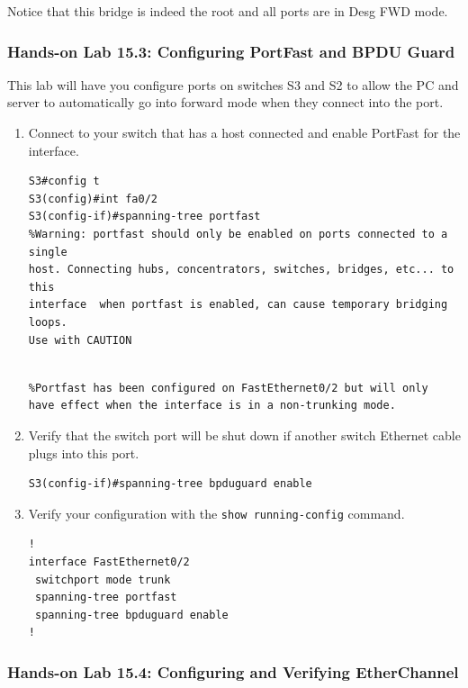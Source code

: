 \documentclass[b5paper,11pt]{memoir}
\begin{document}
Notice that this bridge is indeed the root and all ports are in Desg FWD
mode.

\subsubsection[Hands-on Lab 15.3: Configuring PortFast and BPDU
Guard]{\texorpdfstring{\protect\hypertarget{c15.xhtmlux5cux23c15-sec-27}{}{}Hands-on
Lab 15.3: Configuring PortFast and BPDU
Guard}{Hands-on Lab 15.3: Configuring PortFast and BPDU Guard}}

This lab will have you configure ports on switches S3 and S2 to allow
the PC and server to automatically go into forward mode when they
connect into the port.

\begin{enumerate}
\item
  Connect to your switch that has a host connected and enable PortFast
  for the interface.

\begin{verbatim}
S3#config t
S3(config)#int fa0/2
S3(config-if)#spanning-tree portfast
%Warning: portfast should only be enabled on ports connected to a single
host. Connecting hubs, concentrators, switches, bridges, etc... to this
interface  when portfast is enabled, can cause temporary bridging loops.
Use with CAUTION
\end{verbatim}

\begin{verbatim}
 
%Portfast has been configured on FastEthernet0/2 but will only
have effect when the interface is in a non-trunking mode.
\end{verbatim}
\item
  Verify that the switch port will be shut down if another switch
  Ethernet cable plugs into this port.

\begin{verbatim}
S3(config-if)#spanning-tree bpduguard enable
\end{verbatim}
\item
  Verify your configuration with the \texttt{show\ running-config}
  command.

\begin{verbatim}
!
interface FastEthernet0/2
 switchport mode trunk
 spanning-tree portfast
 spanning-tree bpduguard enable
!
\end{verbatim}
\end{enumerate}

\subsubsection[Hands-on Lab 15.4: Configuring and Verifying
EtherChannel]{\texorpdfstring{\protect\hypertarget{c15.xhtmlux5cux23c15-sec-28}{}{}Hands-on
Lab 15.4: Configuring and Verifying
EtherChannel}{Hands-on Lab 15.4: Configuring and Verifying EtherChannel}}
\end{document}
